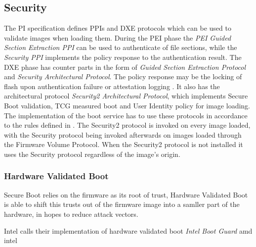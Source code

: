 
\subsection{Security}
\label{sec:uefi-pi:pi:security}

The \ac{PI} specification defines \acp{PPI} and \ac{DXE} protocols which can be used to validate images when loading them.
During the \ac{PEI} phase the \emph{\ac{PEI} Guided Section Extraction \ac{PPI}} can be used to authenticate of file sections, while the \emph{Security \ac{PPI}} implements the policy response to the authentication result.
The \ac{DXE} phase has counter parts in the form of \emph{Guided Section Extraction Protocol} and \emph{Security Architectural Protocol}.
The policy response may be the locking of flash upon authentication failure or attestation logging \cite[Vol. 2, Section 12.9.1]{pi-spec}.
It also has the architectural protocol \emph{Security2 Architectural Protocol}, which implements Secure Boot validation, \ac{TCG} measured boot and User Identity policy for image loading.
The implementation of the boot service  has to use these protocols in accordance to the rules defined in \cite[Vol. 2, Section 12.9.2]{pi-spec}.
The Security2 protocol is invoked on every image loaded, with the Security protocol being invoked afterwards on images loaded through the Firmware Volume Protocol.
When the Security2 protocol is not installed it uses the Security protocol regardless of the image's origin.


\subsubsection{Hardware Validated Boot}


Secure Boot relies on the firmware as its root of trust, Hardware Validated Boot is able to shift this trusts out of the firmware image into a samller part of the hardware, in hopes to reduce attack vectors.

Intel calls their implementation of hardware validated boot \emph{Intel Boot Guard}
amd
intel

